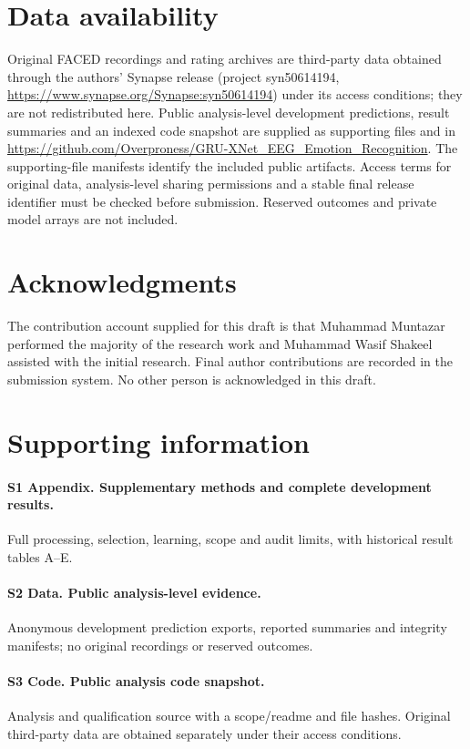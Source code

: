 \documentclass[10pt,letterpaper]{article}
\begin{document}
\section*{Data availability}
Original FACED recordings and rating archives are third-party data obtained through the authors' Synapse release (project syn50614194, \url{https://www.synapse.org/Synapse:syn50614194}) under its access conditions; they are not redistributed here. Public analysis-level development predictions, result summaries and an indexed code snapshot are supplied as supporting files and in \url{https://github.com/Overproness/GRU-XNet_EEG_Emotion_Recognition}. The supporting-file manifests identify the included public artifacts. Access terms for original data, analysis-level sharing permissions and a stable final release identifier must be checked before submission. Reserved outcomes and private model arrays are not included.
\section*{Acknowledgments}
The contribution account supplied for this draft is that Muhammad Muntazar performed the majority of the research work and Muhammad Wasif Shakeel assisted with the initial research. Final author contributions are recorded in the submission system. No other person is acknowledged in this draft.

\section*{Supporting information}
\paragraph{S1 Appendix. Supplementary methods and complete development results.}
Full processing, selection, learning, scope and audit limits, with historical result tables A--E.
\paragraph{S2 Data. Public analysis-level evidence.}
Anonymous development prediction exports, reported summaries and integrity manifests; no original recordings or reserved outcomes.
\paragraph{S3 Code. Public analysis code snapshot.}
Analysis and qualification source with a scope/readme and file hashes. Original third-party data are obtained separately under their access conditions.
\end{document}

